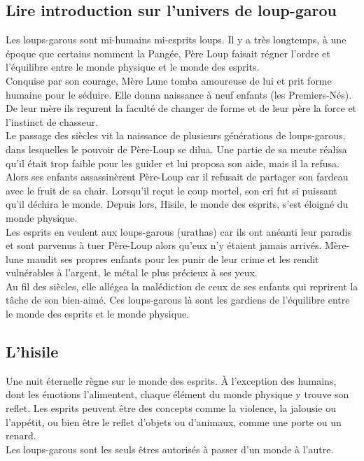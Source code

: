 \documentclass[oneside,12pt]{book}
\begin{document}
\begin{flushleft}
    \section{Lire introduction sur l'univers de loup-garou}
       Les loups-garous sont mi-humains mi-esprits loups. 
       Il y a très longtemps, à une époque que certains nomment la Pangée, 
       Père Loup faisait régner l'ordre et l’équilibre entre le monde physique et le monde des esprits.\\ 
       Conquise par son courage, Mère Lune tomba amoureuse de lui et prit forme humaine pour le séduire. 
       Elle donna naissance à neuf enfants (les Premiers-Nés). 
       De leur mère ils reçurent la faculté de changer de forme et de leur père la force et l'instinct de chasseur.\\ 
       Le passage des siècles vit la naissance de plusieurs générations de loups-garous, 
       dans lesquelles le pouvoir de Père-Loup se dilua. 
       Une partie de sa meute réalisa qu'il était trop faible pour les guider et lui proposa son aide, mais il la refusa. Alors ses enfants assassinèrent Père-Loup car il refusait de partager son fardeau avec le fruit de sa chair. Lorsqu’il reçut le coup mortel, son cri fut si puissant qu’il déchira le monde. Depuis lors, Hisile, le monde des esprits, s’est éloigné du monde physique.\\ Les esprits en veulent aux loups-garous (urathas) car ils ont anéanti leur paradis et sont parvenus à tuer Père-Loup alors qu’eux n’y étaient jamais arrivés. Mère-lune maudit ses propres enfants pour les punir de leur crime et les rendit vulnérables à l'argent, le métal le plus précieux à ses yeux.\\ 
       Au fil des siècles, elle allégea la malédiction de ceux de ses enfants qui reprirent la tâche de son bien-aimé. 
       Ces loups-garous là sont les gardiens de l’équilibre entre le monde des esprits et le monde physique.  \\
   \subsection{L'hisile}    
Une nuit éternelle règne sur le monde des esprits. 
À l’exception des humains, dont les émotions l’alimentent, chaque élément du monde physique y trouve son reflet. 
Les esprits peuvent être des concepts comme la violence, la jalousie ou l'appétit, ou bien être le reflet d’objets ou d’animaux, comme une porte ou un renard.\\ Les loups-garous sont les seuls êtres autorisés à passer d’un monde à l’autre.


\end{flushleft}
\end{document}
